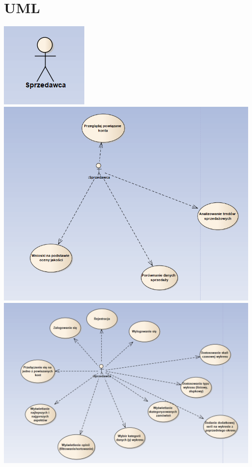 \documentclass[a4paper,11pt]{article}
\begin{document}
\section{UML}
\includegraphics[scale=0.5]{src/u8.png}\\
\includegraphics[scale=0.5]{src/u1.png}\\
\includegraphics[scale=0.5]{src/u2.png}\\
\end{document}
